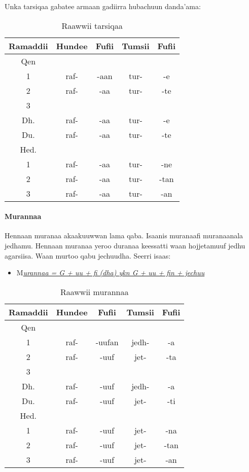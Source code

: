 \documentclass[11pt,b5paper]{book}
\begin{document}
Unka tarsiqaa gabatee armaan gadiirra hubachuun danda'ama:
\begin{table}[H]
	\centering
	\caption{Raawwii tarsiqaa}
	\begin{tabular}{ccccc}
		\hline\hline
		Ramaddii & Hundee & Fufii & Tumsii & Fufii \\
		\hline
		Qen &  &  &  &  \\
		1	& raf- & -aan & tur- & -e		\\
		2	& raf- & -aa & tur- & -te	\\
		3 \\
		Dh.	& raf- & -aa & tur- & -e		\\
		Du.	& raf- & -aa & tur- & -te		\\
		\hline
		Hed. \\
		1   & raf- & -aa & tur- & -ne    \\
		2   & raf- & -aa & tur- & -tan     \\
		3   & raf- & -aa & tur- & -an     \\
		\hline
		
	\end{tabular}
\end{table}

\paragraph{Murannaa}

Hennaan muranaa akaakuuwwan lama qaba. Isaanis muranaafi muranaanala jedhamu. Hennaan muranaa yeroo duranaa
keessatti waan hojjetamuuf jedhu agarsiisa. Waan murtoo qabu jechuudha. Seerri isaas: 
\begin{itemize}
	\item M\textit{\underline{urannaa = G + uu + fi (dha) ykn G + uu + fin + jechuu }}
\end{itemize}

\begin{table}[H]
	\centering
	\caption{Raawwii murannaa}
	\begin{tabular}{ccccc}
		\hline\hline
		Ramaddii & Hundee & Fufii & Tumsii & Fufii \\
		\hline
		Qen &  &  &  &  \\
		1	& raf- & -uufan & jedh- & -a		\\
		2	& raf- & -uuf & jet- & -ta	\\
		3 \\
		Dh.	& raf- & -uuf & jedh- & -a	\\
		Du.	& raf- & -uuf & jet- & -ti	\\
		\hline
		Hed. \\
		1   & raf- & -uuf & jet- & -na   \\
		2   & raf- & -uuf & jet- & -tan     \\
		3   & raf- & -uuf & jet- & -an     \\
		\hline
	\end{tabular}
\end{table}
\end{document}
